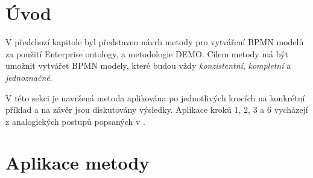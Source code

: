 \section{Úvod}
V předchozí kapitole byl představen návrh metody pro vytváření BPMN modelů za použití Enterprise ontology, \ptheory{} a metodologie DEMO. Cílem metody má být umožnit vytvářet BPMN modely, které budou vždy \textit{konzistentní}, \textit{kompletní} a \textit{jednoznačné}.

V této sekci je navržená metoda aplikována po jednotlivých krocích na konkrétní příklad a na závěr jsou diskutovány výsledky. Aplikace kroků 1, 2, 3 a 6 vycházejí z analogických postupů popsaných v \cite{Dietz2006}.

\section{Aplikace metody}
